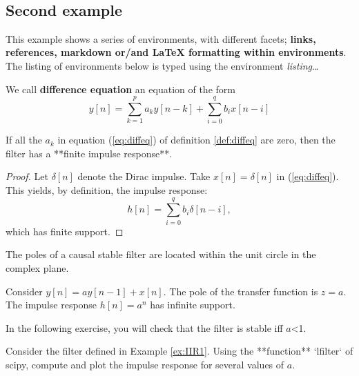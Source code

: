 \documentclass[11pt]{article}
\begin{document}
    \begin{center}
    \end{center}
    { \hspace*{\fill} \\}
    
    \subsection{Second example}\label{second-example}

    This example shows a series of environments, with different facets;
\textbf{links, references, markdown or/and LaTeX formatting within
environments}. The listing of environments below is typed using the
environment \emph{listing}\ldots{}

    \begin{listing}
\begin{definition} \label{def:diffeq}
We call \textbf{difference equation} an equation of the form
$$
\label{eq:diffeq}
y[n]= \sum_{k=1}^{p} a_k y[n-k] + \sum_{i=0}^q b_i x[n-i]
$$
\end{definition}

\begin{property}
If all the $a_k$ in equation (\ref{eq:diffeq}) of definition \ref{def:diffeq} are zero, then the filter has a **finite impulse response**. 
\end{property}

\begin{proof}
Let $\delta[n]$ denote the Dirac impulse. Take $x[n]=\delta[n]$ in (\ref{eq:diffeq}). This yields, by definition, the impulse response:
$$
\label{eq:fir}
h[n]= \sum_{i=0}^q b_i \delta[n-i],
$$
which has finite support. 
\end{proof}

\begin{theorem}
The poles of a causal stable filter are located within the unit circle in the complex plane.
\end{theorem}

\begin{example} \label{ex:IIR1}
Consider $y[n]= a y[n-1] +  x[n]$. The pole of the transfer function is $z=a$. The impulse response $h[n]=a^n$ has infinite support.
\end{example}

In the following exercise, you will check that the filter is stable iff $a$<1.

\begin{exercise}\label{ex:exofilter}
Consider the filter defined in Example \ref{ex:IIR1}. Using the **function** `lfilter` of scipy, compute and plot the impulse response for several values of $a$.
\end{exercise}

\end{listing}
\end{document}
